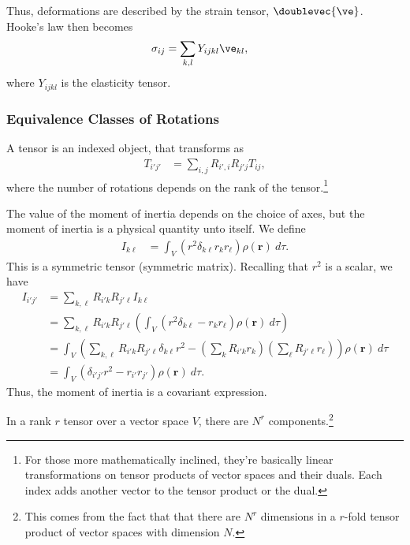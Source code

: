\documentclass[10pt]{mypackage}
\begin{document}
  Thus, deformations are described by the strain tensor, $\doublevec{\ve}$. Hooke's law then becomes
  \begin{align*}
    \sigma_{ij} &= \sum_{k,l}Y_{ijkl}\ve_{kl},
  \end{align*}
  where $Y_{ijkl}$ is the elasticity tensor.
  \subsubsection{Equivalence Classes of Rotations}%
  A tensor is an indexed object, that transforms as
  \begin{align*}
    T_{i'j'} &= \sum_{i,j}R_{i',i}R_{j' j}T_{ij},
  \end{align*}
  where the number of rotations depends on the rank of the tensor.\footnote{For those more mathematically inclined, they're basically linear transformations on tensor products of vector spaces and their duals. Each index adds another vector to the tensor product or the dual.}
  \begin{example}
    The value of the moment of inertia depends on the choice of axes, but the moment of inertia is a physical quantity unto itself. We define
    \begin{align*}
      I_{k\ell} &= \int_{V}^{} \left( r^2\delta_{k\ell}r_kr_{\ell} \right)\rho\left( \mathbf{r} \right)\:d\tau.
    \end{align*}
    This is a symmetric tensor (symmetric matrix). Recalling that $r^2$ is a scalar, we have
    \begin{align*}
      I_{i'j'} &= \sum_{k,\ell}R_{i' k}R_{j' \ell}I_{k\ell}\\
               &= \sum_{k,\ell}R_{i' k}R_{j' \ell} \left( \int_{V}^{} \left( r^2\delta_{k\ell}-r_kr_{\ell} \right)\rho\left( \mathbf{r} \right)\:d\tau \right)\\
               &= \int_{V}^{} \left( \sum_{k,\ell}R_{i' k}R_{j' \ell}\delta_{k\ell}r^2 - \left( \sum_{k}R_{i' k}r_k \right)\left( \sum_{\ell}R_{j' \ell}r_{\ell} \right) \right)\rho\left( \mathbf{r} \right)\:d\tau\\
               &= \int_{V}^{} \left( \delta_{i' j'}r^2 - r_{i'}r_{j'} \right)\rho\left( \mathbf{r} \right)\:d\tau.
    \end{align*}
    Thus, the moment of inertia is a covariant expression.
  \end{example}
  In a rank $r$ tensor over a vector space $V$, there are $N^{r}$ components.\footnote{This comes from the fact that that there are $N^{r}$ dimensions in a $r$-fold tensor product of vector spaces with dimension $N$.}\newline
\end{document}
